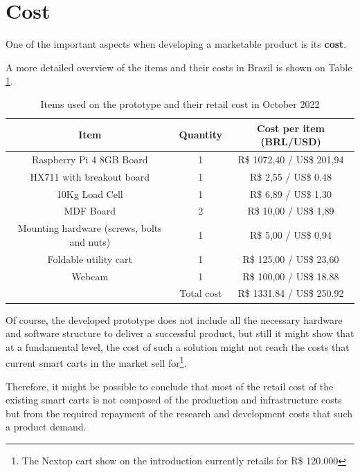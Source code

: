 \documentclass[openright]{normas-utf-tex} %
\begin{document}
\section{Cost}

One of the important aspects when developing a marketable product is its \textbf{cost}.

A more detailed overview of the items and their costs in Brazil is shown on Table \ref{tbl:cost}.

\begin{table}[H]
	\centering
	\label{tab:correlacao}
	\begin{tabular}{c c c}
		\hline 
        Item & Quantity & Cost per item (BRL/USD) \\
		\hline
        Raspberry Pi 4 8GB Board &  1 & R\$ 1072,40 / US\$ 201,94 \\
        HX711 with breakout board &  1  & R\$ 2,55 / US\$ 0.48 \\
        10Kg Load Cell & 1 & R\$ 6,89 / US\$ 1,30 \\
        MDF Board &  2  & R\$ 10,00 / US\$ 1,89 \\
        Mounting hardware (screws, bolts and nuts) &  1  & R\$ 5,00 / US\$ 0,94 \\
        Foldable utility cart &  1  & R\$ 125,00 / US\$ 23,60 \\
        Webcam &  1  & R\$ 100,00 / US\$ 18.88 \\
		\hline 
        & Total cost & R\$ 1331.84 / US\$ 250.92 \\
        \hline
	\end{tabular}
    \caption[Items used on the prototype and their approximate retail cost in Brazil as of October 2022]{Items used on the prototype and their retail cost in October 2022}
    \label{tbl:cost}
\end{table}

Of course, the developed prototype does not include all the necessary hardware
and software structure to deliver a successful product, but still it might show that at a
fundamental level, the cost of such a solution might not reach the costs that
current smart carts in the market sell for\footnote{The Nextop cart show on the
introduction currently retails for R\$ 120.000}.

Therefore, it might be possible to conclude that most of the retail cost of the
existing smart carts is not composed of the production and infrastructure costs
but from the required repayment of the research and development costs that such
a product demand.
\end{document}
